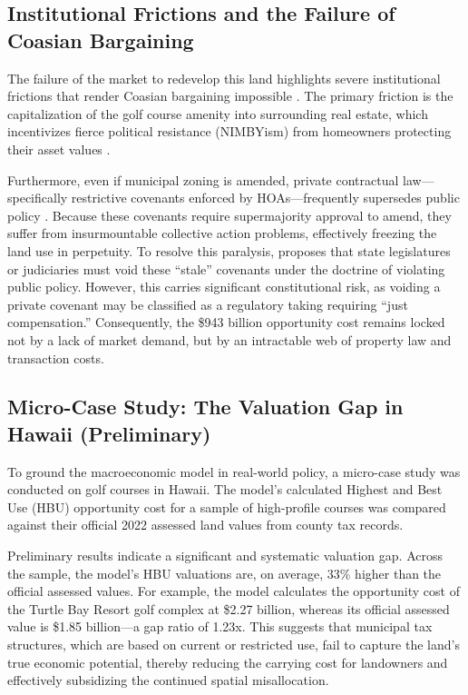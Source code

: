 \documentclass[10pt, letterpaper]{article}
\begin{document}
\subsection{Institutional Frictions and the Failure of Coasian Bargaining}
The failure of the market to redevelop this land highlights severe institutional frictions that render Coasian bargaining impossible \parencite{Coase1960}. The primary friction is the capitalization of the golf course amenity into surrounding real estate, which incentivizes fierce political resistance (NIMBYism) from homeowners protecting their asset values \parencite{Cheshire2002}.

Furthermore, even if municipal zoning is amended, private contractual law—specifically restrictive covenants enforced by HOAs—frequently supersedes public policy \parencite{Ellickson2022}. Because these covenants require supermajority approval to amend, they suffer from insurmountable collective action problems, effectively freezing the land use in perpetuity. To resolve this paralysis, \textcite{Korngold2024} proposes that state legislatures or judiciaries must void these ``stale'' covenants under the doctrine of violating public policy. However, this carries significant constitutional risk, as voiding a private covenant may be classified as a regulatory taking requiring ``just compensation.'' Consequently, the \$943 billion opportunity cost remains locked not by a lack of market demand, but by an intractable web of property law and transaction costs.

\subsection{Micro-Case Study: The Valuation Gap in Hawaii (Preliminary)}
To ground the macroeconomic model in real-world policy, a micro-case study was conducted on golf courses in Hawaii. The model's calculated Highest and Best Use (HBU) opportunity cost for a sample of high-profile courses was compared against their official 2022 assessed land values from county tax records.

Preliminary results indicate a significant and systematic valuation gap. Across the sample, the model's HBU valuations are, on average, 33\% higher than the official assessed values. For example, the model calculates the opportunity cost of the Turtle Bay Resort golf complex at \$2.27 billion, whereas its official assessed value is \$1.85 billion—a gap ratio of 1.23x. This suggests that municipal tax structures, which are based on current or restricted use, fail to capture the land's true economic potential, thereby reducing the carrying cost for landowners and effectively subsidizing the continued spatial misallocation.
\end{document}
